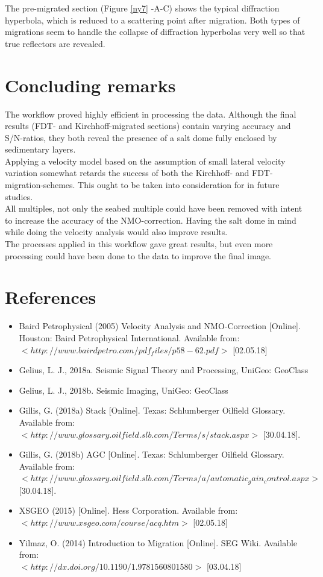\documentclass[10pt,a4paper]{article}
\begin{document}
\noindent The pre-migrated section (Figure \ref{ny7} -A-C) shows the typical diffraction hyperbola, which is reduced to a scattering point after migration. Both types of migrations seem to handle the collapse of diffraction hyperbolas very well so that true reflectors are revealed. 

\section{Concluding remarks}
The workflow proved highly efficient in processing the data. Although the final results (FDT- and Kirchhoff-migrated sections) contain varying accuracy and S/N-ratios, they both reveal the presence of a salt dome fully enclosed by sedimentary layers. 
\\
Applying a velocity model based on the assumption of small lateral velocity variation somewhat retards the success of both the Kirchhoff- and FDT-migration-schemes. This ought to be taken into consideration for in future studies.
\\
All multiples, not only the seabed multiple could have been removed with intent to increase the accuracy of the NMO-correction. Having the salt dome in mind while doing the velocity analysis would also improve results.
\\
The processes applied in this workflow gave great results, but even more processing could have been done to the data to improve the final image.

\newpage

\section{References}

\begin{itemize}
    \item Baird Petrophysical (2005) Velocity Analysis and NMO-Correction [Online]. Houston: Baird Petrophysical International. Available from: $<http://www.bairdpetro.com/pdf_files/p58-62.pdf>$ [02.05.18]
    \item Gelius, L. J., 2018a. Seismic Signal Theory and Processing, UniGeo: GeoClass 
    \item Gelius, L. J., 2018b. Seismic Imaging, UniGeo: GeoClass
    \item Gillis, G. (2018a) Stack [Online]. Texas: Schlumberger Oilfield Glossary. Available from:\\ $<http://www.glossary.oilfield.slb.com/Terms/s/stack.aspx>$ [30.04.18].
    \item Gillis, G. (2018b) AGC [Online]. Texas: Schlumberger Oilfield Glossary. Available from:\\ $<http://www.glossary.oilfield.slb.com/Terms/a/automatic_gain_control.aspx>$ [30.04.18].
    \item XSGEO (2015) [Online]. Hess Corporation. Available from: $<http://www.xsgeo.com/course/acq.htm>$ [02.05.18]
    \item Yilmaz, O. (2014) Introduction to Migration [Online]. SEG Wiki. Available from:\\ $<http://dx.doi.org/10.1190/1.9781560801580>$ [03.04.18]
\end{itemize}
\end{document}
